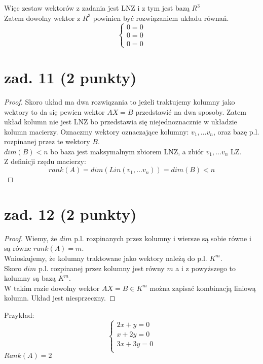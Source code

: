 \documentclass{article}
\begin{document}
Więc zestaw wektorów z zadania jest LNZ i z tym jest bazą $R^3$
\\
Zatem dowolny wektor z $R^3$ powinien być rozwiązaniem układu równań.
$$\begin{cases} 0=0 \\ 0=0 \\ 0=0  \end{cases}$$

\section{zad. 11 (2 punkty)}
\begin{proof}
Skoro układ ma dwa rozwiązania to jeżeli traktujemy kolumny jako wektory to da się pewien wektor $AX = B$
przedstawić na dwa sposoby. Zatem układ kolumn nie jest LNZ bo przedstawia się niejednoznacznie w układzie kolumn macierzy. Oznaczmy wektory oznaczające kolumny: $v_1, \dots v_n$, oraz bazę p.l. rozpinanej przez te wektory $B$.\\
$dim(B) < n$ bo baza jest maksymalnym zbiorem LNZ, a zbiór $v_1, \dots v_n$ LZ.\\
Z definicji rzędu macierzy:
$$
rank(A) = dim(Lin(v_1, \dots v_n)) = dim(B) < n
$$
\end{proof}


\section{zad. 12 (2 punkty)}
\begin{proof}
Wiemy, że $dim$ p.l. rozpinanych przez kolumny i wiersze są sobie równe i są równe $rank(A) = m$.\\
Wnioskujemy, że kolumny traktowane jako wektory należą do p.l. $K^m$.\\
Skoro $dim$ p.l. rozpinanej przez kolumny jest równy $m$ a i z powyższego to kolumny są bazą $K^m$.\\
W takim razie dowolny wektor $AX = B \in K^m$ można zapisać kombinacją liniową kolumn. Układ jest niesprzeczny.
\end{proof}
Przykład:\\
$$
\begin{cases}
2x + y = 0\\
x + 2y = 0\\
3x + 3y = 0\\
\end{cases}
$$
$Rank(A) = 2$
\end{document}
